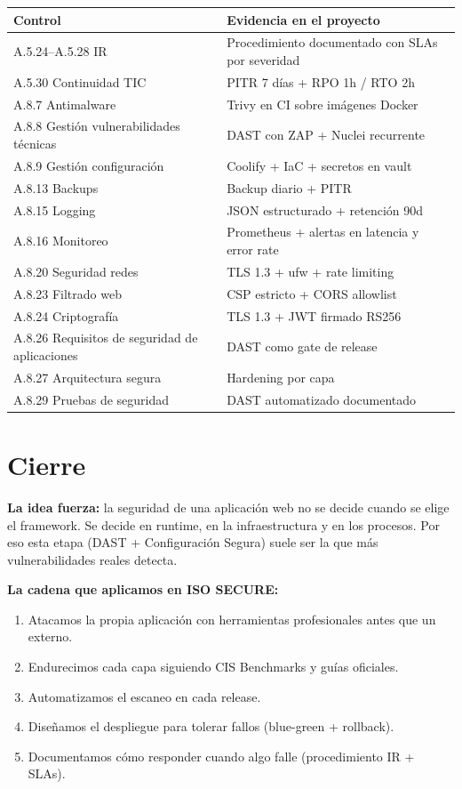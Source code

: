 \documentclass[12pt,a4paper,oneside]{article}
\begin{document}
\begin{table}[h]
\centering
\small
\begin{tabularx}{\textwidth}{lX}
\toprule
\textbf{Control} & \textbf{Evidencia en el proyecto} \\
\midrule
A.5.24--A.5.28 IR & Procedimiento documentado con SLAs por severidad \\
A.5.30 Continuidad TIC & PITR 7 días + RPO 1h / RTO 2h \\
A.8.7 Antimalware & Trivy en CI sobre imágenes Docker \\
A.8.8 Gestión vulnerabilidades técnicas & DAST con ZAP + Nuclei recurrente \\
A.8.9 Gestión configuración & Coolify + IaC + secretos en vault \\
A.8.13 Backups & Backup diario + PITR \\
A.8.15 Logging & JSON estructurado + retención 90d \\
A.8.16 Monitoreo & Prometheus + alertas en latencia y error rate \\
A.8.20 Seguridad redes & TLS 1.3 + ufw + rate limiting \\
A.8.23 Filtrado web & CSP estricto + CORS allowlist \\
A.8.24 Criptografía & TLS 1.3 + JWT firmado RS256 \\
A.8.26 Requisitos de seguridad de aplicaciones & DAST como gate de release \\
A.8.27 Arquitectura segura & Hardening por capa \\
A.8.29 Pruebas de seguridad & DAST automatizado documentado \\
\bottomrule
\end{tabularx}
\end{table}

\section{Cierre}

\textbf{La idea fuerza:} la seguridad de una aplicación web no se decide cuando se elige el framework. Se decide en runtime, en la infraestructura y en los procesos. Por eso esta etapa (DAST + Configuración Segura) suele ser la que más vulnerabilidades reales detecta.

\textbf{La cadena que aplicamos en ISO SECURE:}

\begin{enumerate}[leftmargin=*]
  \item Atacamos la propia aplicación con herramientas profesionales antes que un externo.
  \item Endurecimos cada capa siguiendo CIS Benchmarks y guías oficiales.
  \item Automatizamos el escaneo en cada release.
  \item Diseñamos el despliegue para tolerar fallos (blue-green + rollback).
  \item Documentamos cómo responder cuando algo falle (procedimiento IR + SLAs).
\end{enumerate}
\end{document}
